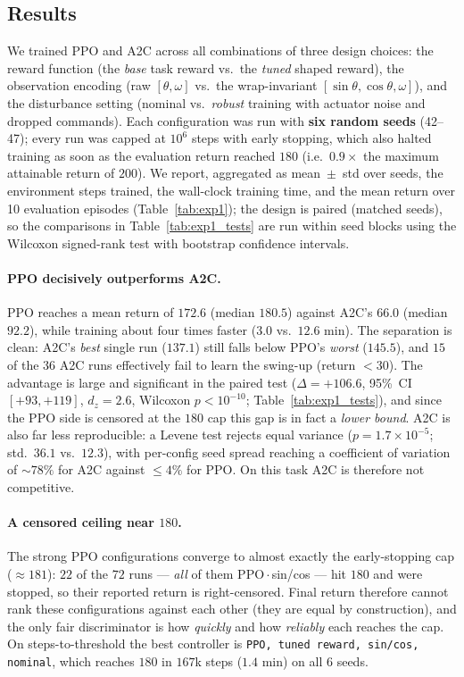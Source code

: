 \subsection{Results}
\label{sec:exp1}

We trained PPO and A2C across all combinations of three design choices: the
reward function (the \emph{base} task reward vs.\ the \emph{tuned} shaped
reward), the observation encoding (raw $[\theta,\omega]$ vs.\ the
wrap-invariant $[\sin\theta,\cos\theta,\omega]$), and the disturbance setting
(nominal vs.\ \emph{robust} training with actuator noise and dropped commands).
Each configuration was run with \textbf{six random seeds} (42--47); every run
was capped at $10^6$ steps with early stopping, which also halted training as
soon as the evaluation return reached $180$ (i.e.\ $0.9\times$ the maximum
attainable return of $200$). We report, aggregated as mean~$\pm$~std over seeds,
the environment steps trained, the wall-clock training time, and the mean return
over 10 evaluation episodes (Table~\ref{tab:exp1}); the design is paired
(matched seeds), so the comparisons in Table~\ref{tab:exp1_tests} are run within
seed blocks using the Wilcoxon signed-rank test with bootstrap confidence
intervals.



\paragraph{PPO decisively outperforms A2C.}
PPO reaches a mean return of $172.6$ (median $180.5$) against A2C's $66.0$
(median $92.2$), while training about four times faster ($3.0$ vs.\ $12.6$ min).
The separation is clean: A2C's \emph{best} single run ($137.1$) still falls
below PPO's \emph{worst} ($145.5$), and $15$ of the $36$ A2C runs effectively
fail to learn the swing-up (return $<30$). The advantage is large and
significant in the paired test (\mbox{$\Delta=+106.6$}, 95\%~CI
$[+93,+119]$, $d_z=2.6$, Wilcoxon $p<10^{-10}$; Table~\ref{tab:exp1_tests}), and
since the PPO side is censored at the $180$ cap this gap is in fact a
\emph{lower bound}. A2C is also far less reproducible: a Levene test rejects
equal variance ($p=1.7\times10^{-5}$; std.\ $36.1$ vs.\ $12.3$), with per-config
seed spread reaching a coefficient of variation of ${\sim}78\%$ for A2C against
${\le}4\%$ for PPO. On this task A2C is therefore not competitive.

\paragraph{A censored ceiling near $180$.}
The strong PPO configurations converge to almost exactly the early-stopping cap
($\approx 181$): $22$ of the $72$ runs --- \emph{all} of them PPO\,$\cdot$\,sin/cos
--- hit $180$ and were stopped, so their reported return is right-censored. Final
return therefore cannot rank these configurations against each other (they are
equal by construction), and the only fair discriminator is how \emph{quickly} and
how \emph{reliably} each reaches the cap. On steps-to-threshold the best
controller is \texttt{PPO, tuned reward, sin/cos, nominal}, which reaches $180$ in
$167$k steps ($1.4$ min) on all $6$ seeds.

